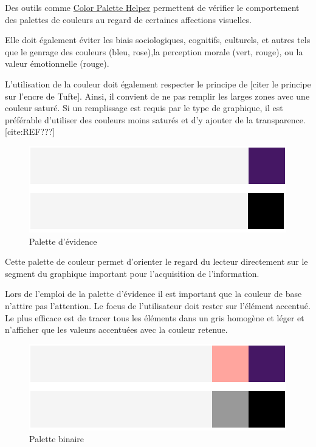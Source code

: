 \documentclass[a4paper,12pt]{article}
\begin{document}
\begin{multicols}{2}
Des outils comme \href{https://gka.github.io/palettes/\#/5|s|ce0072,96ffea,00ffad|ffffe0,ff005e,93003a|1|1}{Color Palette Helper} permettent de vérifier le comportement des palettes de couleurs au regard de certaines affections visuelles.

Elle doit également éviter les biais sociologiques, cognitifs, culturels, et autres tels que le genrage des couleurs (bleu, rose),\autocite{andreaskrauseBestPracticesData2024}la perception morale (vert, rouge),\autocite[sur le rouge en chine]{article} ou la valeur émotionnelle (rouge).\autocite{tranDiscoveringAccessibleData2024}

L'utilisation de la couleur doit également respecter le principe de [citer le principe sur l'encre de Tufte]. Ainsi, il convient de ne pas remplir les larges zones avec une couleur saturé.\autocite{wilkeCommonPitfallsColor2019} Si un remplissage est requis par le type de graphique, il est préférable d'utiliser des couleurs moins saturés et d'y ajouter de la transparence. [cite:REF???] 

\begin{figure}[H]
\centering
\includegraphics[width=.9\linewidth]{./img/palette-evidence.pdf}
\caption{\label{fig:org03cc3a3}Palette d'évidence}
\end{figure}

Cette palette de couleur permet d'orienter le regard du lecteur directement sur le segment du graphique important pour l'acquisition de l'information.\autocite{andreaskrauseBestPracticesData2024}

Lors de l'emploi de la palette d'évidence il est important que la couleur de base n'attire pas l'attention. Le focus de l'utilisateur doit rester sur l'élément accentué.\autocite{wilkeColorScales2019}
Le plus efficace est de tracer tous les éléments dans un gris homogène et léger et n'afficher que les valeurs accentuées avec la couleur retenue. \autocite{wilkeColorScales2019}

\begin{figure}[H]
\centering
\includegraphics[width=.9\linewidth]{./img/palette-binaire.pdf}
\caption{\label{fig:orge258709}Palette binaire}
\end{figure}


\end{multicols}
\end{document}
